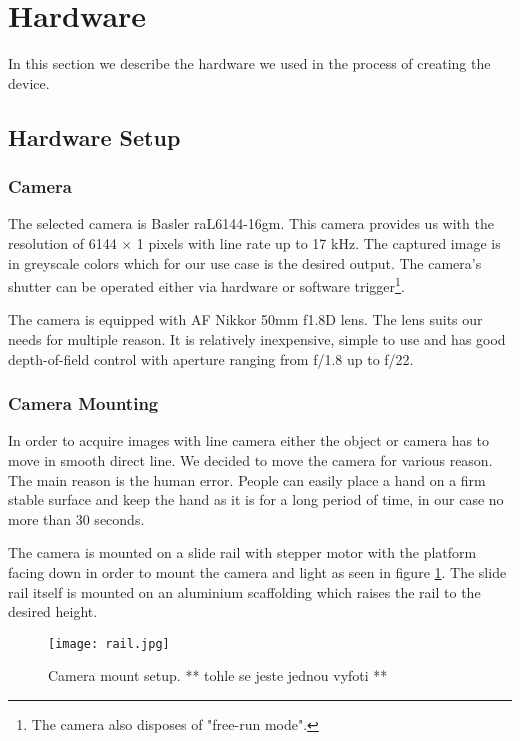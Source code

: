 \section{Hardware}
\label{sec:hw}

In this section we describe the hardware we used in the process of creating the device.

\subsection{Hardware Setup}


\subsubsection*{Camera}
The selected camera is Basler raL6144-16gm. This camera provides us with the resolution of 6144 $\times$ 1 pixels with line rate up to 17 kHz. The captured image is in greyscale colors which for our use case is the desired output. The camera's shutter can be operated either via hardware or software trigger\footnote{The camera also disposes of "free-run mode".}.

The camera is equipped with AF Nikkor 50mm f1.8D lens. The lens suits our needs for multiple reason. It is relatively inexpensive, simple to use and has good depth-of-field control with aperture ranging from f/1.8 up to f/22.

\subsubsection*{Camera Mounting}
In order to acquire images with line camera either the object or camera has to move in smooth direct line. We decided to move the camera for various reason. The main reason is the human error. People can easily place a hand on a firm stable surface and keep the hand as it is for a long period of time, in our case no more than 30 seconds.

The camera is mounted on a slide rail with stepper motor with the platform facing down in order to mount the camera and light as seen in figure \ref{fig:rail}. The slide rail itself is mounted on an aluminium scaffolding which raises the rail to the desired height.

\begin{figure}[h]
    \label{fig:rail}
    \texttt{[image: rail.jpg]}
    \caption{Camera mount setup. ** tohle se jeste jednou vyfoti **}
\end{figure}

